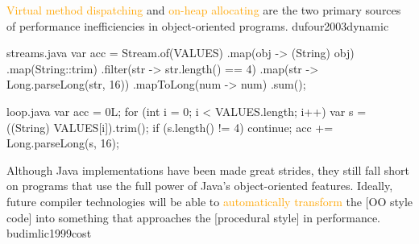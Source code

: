 \documentclass{article}
\newcommand\hlt[1]{\textcolor{orange}{#1}}
\newenvironment{lnSnippet}[1][lnSnippet.txt]
  {\VerbatimEnvironment\begin{VerbatimOut}{#1}}
  {\end{VerbatimOut}}
\begin{document}
  {\hlt{Virtual method dispatching} and \hlt{on-heap allocating} are the two primary sources of performance inefficiencies in object-oriented programs.}
  {dufour2003dynamic}

\begin{lnSnippet}[streams.java]
var acc = Stream.of(VALUES)
  .map(obj -> (String) obj)
  .map(String::trim)
  .filter(str -> str.length() == 4)
  .map(str -> Long.parseLong(str, 16))
  .mapToLong(num -> num)
  .sum();
\end{lnSnippet}
\begin{lnSnippet}[loop.java]
var acc = 0L;
for (int i = 0; i < VALUES.length; i++) {
  var s = ((String) VALUES[i]).trim();
  if (s.length() != 4) continue;
  acc += Long.parseLong(s, 16);
}
\end{lnSnippet}


  {Although Java implementations have been made great strides, they still fall short on programs that use the full power of Java’s object-oriented features. Ideally, future compiler technologies will be able to \hlt{automatically transform} the [OO style code] into something that approaches the [procedural style] in performance.}
  {budimlic1999cost}
\end{document}
